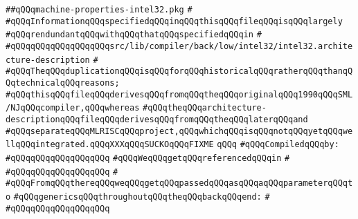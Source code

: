 \label{src/lib/compiler/back/low/main/intel32/machine-properties-intel32.pkg}
\verb|##qQQqmachine-properties-intel32.pkg|\newline
\verb|#|\newline
\verb|#qQQqInformationqQQqspecifiedqQQqinqQQqthisqQQqfileqQQqisqQQqlargely|\newline
\verb|#qQQqrendundantqQQqwithqQQqthatqQQqspecifiedqQQqin|\newline
\verb|#|\newline
\verb|#qQQqqQQqqQQqqQQqqQQqsrc/lib/compiler/back/low/intel32/intel32.architecture-description|\newline
\verb|#|\newline
\verb|#qQQqTheqQQqduplicationqQQqisqQQqforqQQqhistoricalqQQqratherqQQqthanqQQqtechnicalqQQqreasons;|\newline
\verb|#qQQqthisqQQqfileqQQqderivesqQQqfromqQQqtheqQQqoriginalqQQq1990qQQqSML/NJqQQqcompiler,qQQqwhereas|\newline
\verb|#qQQqtheqQQqarchitecture-descriptionqQQqfileqQQqderivesqQQqfromqQQqtheqQQqlaterqQQqand|\newline
\verb|#qQQqseparateqQQqMLRISCqQQqproject,qQQqwhichqQQqisqQQqnotqQQqyetqQQqwellqQQqintegrated.qQQqXXXqQQqSUCKOqQQqFIXME|\newline
\verb|qQQq|\newline
\verb|#qQQqCompiledqQQqby:|\newline
\verb|#qQQqqQQqqQQqqQQqqQQq|\newline
\newline
\verb|#qQQqWeqQQqgetqQQqreferencedqQQqin|\newline
\verb|#|\newline
\verb|#qQQqqQQqqQQqqQQqqQQq|\newline
\verb|#|\newline
\verb|#qQQqFromqQQqthereqQQqweqQQqgetqQQqpassedqQQqasqQQqaqQQqparameterqQQqto|\newline
\verb|#qQQqgenericsqQQqthroughoutqQQqtheqQQqbackqQQqend:|\newline
\verb|#|\newline
\verb|#qQQqqQQqqQQqqQQqqQQq|\newline

